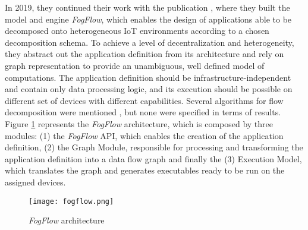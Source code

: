 \par In 2019, they continued their work with the publication \cite{fog_flow}, where they built the model and engine \textit{FogFlow}, which enables the design of applications able to be decomposed onto heterogeneous IoT environments according to a chosen decomposition schema. To achieve a level of decentralization and heterogeneity, they abstract out the application definition from its architecture and rely on graph representation to provide an unambiguous, well defined model of computations. The application definition should be infrastructure-independent and contain only data processing logic, and its execution should be possible on different set of devices with different capabilities. Several algorithms for flow decomposition were mentioned \cite{algorithm_fog} \cite{ifogsim}, but none were specified in terms of results. Figure \ref{fig:fogflow} represents the \textit{FogFlow} architecture, which is composed by three modules: (1) the \textit{FogFlow} API, which enables the creation of the application definition, (2) the Graph Module, responsible for processing and transforming the application definition into a data flow graph and finally the (3) Execution Model, which translates the graph and generates executables ready to be run on the assigned devices.

\begin{figure}[h]
\caption{\textit{FogFlow} architecture \cite{fog_flow}}
\label{fig:fogflow}
\centering
\texttt{[image: fogflow.png]}
\end{figure}

